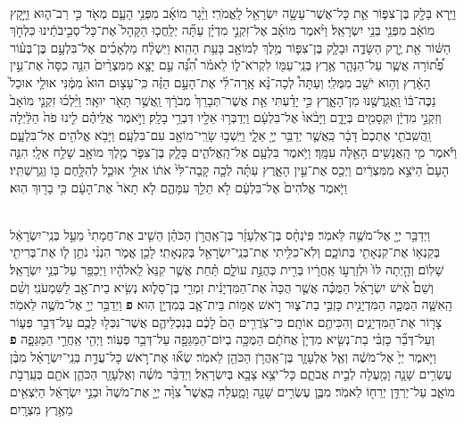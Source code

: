 \documentclass[twoside, openany, parskip=half, 11pt]{book}
\begin{document}
\begin{footnotesize}
\begin{multicols}{2}
\\
 וַיַּ֥רְא בָּלָ֖ק בֶּן־צִפּ֑וֹר אֵ֛ת כָּל־אֲשֶׁר־עָשָׂ֥ה יִשְׂרָאֵ֖ל לָֽאֱמֹרִֽי׃ וַיָּ֨גָר מוֹאָ֜ב מִפְּנֵ֥י הָעָ֛ם מְאֹ֖ד כִּ֣י רַב־ה֑וּא וַיָּ֣קָץ מוֹאָ֔ב מִפְּנֵ֖י בְּנֵ֥י יִשְׂרָאֵֽל׃ וַיֹּ֨אמֶר מוֹאָ֜ב אֶל־זִקְנֵ֣י מִדְיָ֗ן עַתָּ֞ה יְלַֽחֲכ֤וּ הַקָּהָל֙ אֶת־כָּל־סְבִ֣יבֹתֵ֔ינוּ כִּלְחֹ֣ךְ הַשּׁ֔וֹר אֵ֖ת יֶ֣רֶק הַשָּׂדֶ֑ה וּבָלָ֧ק בֶּן־צִפּ֛וֹר מֶ֥לֶךְ לְמוֹאָ֖ב בָּעֵ֥ת הַהִֽוא׃  וַיִּשְׁלַ֨ח מַלְאָכִ֜ים אֶל־בִּלְעָ֣ם בֶּן־בְּע֗וֹר פְּ֠ת֠וֹרָה אֲשֶׁ֧ר עַל־הַנָּהָ֛ר אֶ֥רֶץ בְּנֵֽי־עַמּ֖וֹ לִקְרֹא־ל֑וֹ לֵאמֹ֗ר הִ֠נֵּ֠ה עַ֣ם יָצָ֤א מִמִּצְרַ֨יִם֙ הִנֵּ֤ה כִסָּה֙ אֶת־עֵ֣ין הָאָ֔רֶץ וְה֥וּא יֹשֵׁ֖ב מִמֻּלִֽי׃ וְעַתָּה֩ לְכָה־נָּ֨א אָֽרָה־לִּ֜י אֶת־הָעָ֣ם הַזֶּ֗ה כִּֽי־עָצ֥וּם הוּא֙ מִמֶּ֔נִּי אוּלַ֤י אוּכַל֙ נַכֶּה־בּ֔וֹ וַֽאֲגָֽרֲשֶׁ֖נּוּ מִן־הָאָ֑רֶץ כִּ֣י יָדַ֗עְתִּי אֵ֤ת אֲשֶׁר־תְּבָרֵךְ֙ מְבֹרָ֔ךְ וַֽאֲשֶׁ֥ר תָּאֹ֖ר יוּאָֽר׃ וַיֵּ֨לְכ֜וּ זִקְנֵ֤י מוֹאָב֙ וְזִקְנֵ֣י מִדְיָ֔ן וּקְסָמִ֖ים בְּיָדָ֑ם וַיָּבֹ֨אוּ֙ אֶל־בִּלְעָ֔ם וַיְדַבְּר֥וּ אֵלָ֖יו דִּבְרֵ֥י בָלָֽק׃  וַיֹּ֣אמֶר אֲלֵיהֶ֗ם לִ֤ינוּ פֹה֙ הַלַּ֔יְלָה וַֽהֲשִֽׁבֹתִ֤י אֶתְכֶם֙ דָּבָ֔ר כַּֽאֲשֶׁ֛ר יְדַבֵּ֥ר יְיָ֖ אֵלָ֑י וַיֵּֽשְׁב֥וּ שָׂרֵֽי־מוֹאָ֖ב עִם־בִּלְעָֽם׃ וַיָּבֹ֥א אֱלֹהִ֖ים אֶל־בִּלְעָ֑ם וַיֹּ֕אמֶר מִ֛י הָֽאֲנָשִׁ֥ים הָאֵ֖לֶּה עִמָּֽךְ׃ וַיֹּ֥אמֶר בִּלְעָ֖ם אֶל־הָֽאֱלֹהִ֑ים בָּלָ֧ק בֶּן־צִפֹּ֛ר מֶ֥לֶךְ מוֹאָ֖ב שָׁלַ֥ח אֵלָֽי׃ הִנֵּ֤ה הָעָם֙ הַיֹּצֵ֣א מִמִּצְרַ֔יִם וַיְכַ֖ס אֶת־עֵ֣ין הָאָ֑רֶץ עַתָּ֗ה לְכָ֤ה קָֽבָה־לִּי֙ אֹת֔וֹ אוּלַ֥י אוּכַ֛ל לְהִלָּ֥חֶם בּ֖וֹ וְגֵֽרַשְׁתִּֽיו׃ וַיֹּ֤אמֶר אֱלֹהִים֙ אֶל־בִּלְעָ֔ם לֹ֥א תֵלֵ֖ךְ עִמָּהֶ֑ם לֹ֤א תָאֹר֙ אֶת־הָעָ֔ם כִּ֥י בָר֖וּךְ הֽוּא׃

\\
 וַיְדַבֵּ֥ר יְיָ֖ אֶל־מֹשֶׁ֥ה לֵּאמֹֽר׃ פִּֽיֹנְחָ֨ס בֶּן־אֶלְעָזָ֜ר בֶּן־אַֽהֲרֹ֣ן הַכֹּהֵ֗ן הֵשִׁ֤יב אֶת־חֲמָתִי֙ מֵעַ֣ל בְּנֵֽי־יִשְׂרָאֵ֔ל בְּקַנְא֥וֹ אֶת־קִנְאָתִ֖י בְּתוֹכָ֑ם וְלֹֽא־כִלִּ֥יתִי אֶת־בְּנֵֽי־יִשְׂרָאֵ֖ל בְּקִנְאָתִֽי׃ לָכֵ֖ן אֱמֹ֑ר הִנְנִ֨י נֹתֵ֥ן ל֛וֹ אֶת־בְּרִיתִ֖י שָׁלֽוֹֹם׃  וְהָ֤יְתָה לּוֹ֙ וּלְזַרְע֣וֹ אַֽחֲרָ֔יו בְּרִ֖ית כְּהֻנַּ֣ת עוֹלָ֑ם תַּ֗חַת אֲשֶׁ֤ר קִנֵּא֙ לֵֽאלֹהָ֔יו וַיְכַפֵּ֖ר עַל־בְּנֵ֥י יִשְׂרָאֵֽל׃ וְשֵׁם֩ אִ֨ישׁ יִשְׂרָאֵ֜ל הַמֻּכֶּ֗ה אֲשֶׁ֤ר הֻכָּה֙ אֶת־הַמִּדְיָנִ֔ית זִמְרִ֖י בֶּן־סָל֑וּא נְשִׂ֥יא בֵית־אָ֖ב לַשִּׁמְעֹנִֽי׃ וְשֵׁ֨ם הָֽאִשָּׁ֧ה הַמֻּכָּ֛ה הַמִּדְיָנִ֖ית כָּזְבִּ֣י בַת־צ֑וּר רֹ֣אשׁ אֻמּ֥וֹת בֵּית־אָ֛ב בְּמִדְיָ֖ן הֽוּא׃ \textbf{פ} 
וַיְדַבֵּ֥ר יְיָ֖ אֶל־מֹשֶׁ֥ה לֵּאמֹֽר׃ צָר֖וֹר אֶת־הַמִּדְיָנִ֑ים וְהִכִּיתֶ֖ם אוֹתָֽם׃ כִּי־צֹֽרֲרִ֥ים הֵם֙ לָכֶ֔ם בְּנִכְלֵיהֶ֛ם אֲשֶׁר־נִכְּל֥וּ לָכֶ֖ם עַל־דְּבַ֣ר פְּע֑וֹר וְעַל־דְּבַ֞ר כָּזְבִּ֨י בַת־נְשִׂ֤יא מִדְיָן֙ אֲחֹתָ֔ם הַמֻּכָּ֥ה בְיוֹם־הַמַּגֵּפָ֖ה עַל־דְּבַ֥ר פְּעֽוֹר׃ וַיְהִ֖י אַֽחֲרֵ֣י הַמַּגֵּפָ֑ה \textbf{פ} 
וַיֹּ֤אמֶר יְיָ֙ אֶל־מֹשֶׁ֔ה וְאֶ֧ל אֶלְעָזָ֛ר בֶּן־אַֽהֲרֹ֥ן הַכֹּהֵ֖ן לֵאמֹֽר׃ שְׂא֞וּ אֶת־רֹ֣אשׁ כָּל־עֲדַ֣ת בְּנֵֽי־יִשְׂרָאֵ֗ל מִבֶּ֨ן עֶשְׂרִ֥ים שָׁנָ֛ה וָמַ֖עְלָה לְבֵ֣ית אֲבֹתָ֑ם כָּל־יֹצֵ֥א צָבָ֖א בְּיִשְׂרָאֵֽל׃ וַיְדַבֵּ֨ר מֹשֶׁ֜ה וְאֶלְעָזָ֧ר הַכֹּהֵ֛ן אֹתָ֖ם בְּעַֽרְבֹ֣ת מוֹאָ֑ב עַל־יַרְדֵּ֥ן יְרֵח֖וֹ לֵאמֹֽר׃ מִבֶּ֛ן עֶשְׂרִ֥ים שָׁנָ֖ה וָמָ֑עְלָה כַּֽאֲשֶׁר֩ צִוָּ֨ה יְיָ֤ אֶת־מֹשֶׁה֙ וּבְנֵ֣י יִשְׂרָאֵ֔ל הַיֹּֽצְאִ֖ים מֵאֶ֥רֶץ מִצְרָֽיִם׃



\end{multicols}
\end{footnotesize}
\end{document}
